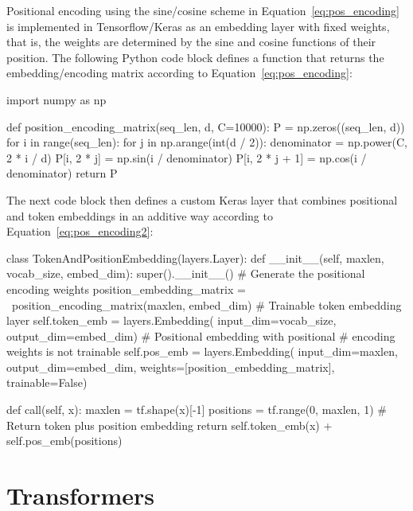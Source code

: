 \begin{withcode}
Positional encoding using the sine/cosine scheme in Equation~\ref{eq:pos_encoding} is implemented  in Tensorflow/Keras as an embedding layer with fixed weights, that is, the weights are determined by the sine and cosine functions of their position. The following Python code block defines a function that returns the embedding/encoding matrix according to Equation~\ref{eq:pos_encoding}:

\begin{pythoncode}
import numpy as np

def position_encoding_matrix(seq_len, d, C=10000):
    P = np.zeros((seq_len, d))
    for i in range(seq_len):
        for j in np.arange(int(d / 2)):
            denominator = np.power(C, 2 * i / d)
            P[i, 2 * j] = np.sin(i / denominator)
            P[i, 2 * j + 1] = np.cos(i / denominator)
    return P
\end{pythoncode}

The next code block then defines a custom Keras layer that combines positional and token embeddings in an additive way according to Equation~\ref{eq:pos_encoding2}:

\begin{pythoncode}
class TokenAndPositionEmbedding(layers.Layer):
    def __init__(self, maxlen, vocab_size, embed_dim):
        super().__init__()
        # Generate the positional encoding weights
        position_embedding_matrix = \
            position_encoding_matrix(maxlen, embed_dim)
        # Trainable token embedding layer
        self.token_emb = layers.Embedding(
            input_dim=vocab_size, 
            output_dim=embed_dim)
        # Positional embedding with positional 
        # encoding weights is not trainable
        self.pos_emb = layers.Embedding(
            input_dim=maxlen, 
            output_dim=embed_dim,
            weights=[position_embedding_matrix],
            trainable=False)

    def call(self, x):
        maxlen = tf.shape(x)[-1]
        positions = tf.range(0, maxlen, 1)
        # Return token plus position embedding
        return self.token_emb(x) + self.pos_emb(positions)
\end{pythoncode}
\end{withcode}

\section{Transformers}


